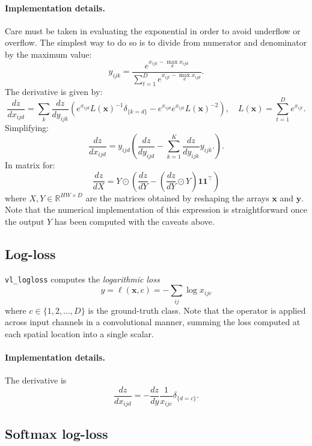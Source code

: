 \documentclass[12pt]{article}
\newcommand{\real}{\mathbb{R}}
\newcommand{\bx}{\mathbf{x}}
\newcommand{\by}{\mathbf{y}}
\newcommand{\bone}{\mathbf{1}}
\begin{document}
\paragraph{Implementation details.} Care must be taken in evaluating the exponential in order to avoid underflow or overflow. The simplest way to do so is to divide from numerator and denominator by the maximum value:
\[
 y_{ijk} = \frac{e^{x_{ijk} - \max_d x_{ijd}}}{\sum_{t=1}^D e^{x_{ijt}- \max_d x_{ijd}}}.
\]
The derivative is given by:
\[
\frac{dz}{d x_{ijd}}
=
\sum_{k}
\frac{dz}{d y_{ijk}}
\left(
e^{x_{ijd}} L(\bx)^{-1} \delta_{\{k=d\}}
-
e^{x_{ijd}}
e^{x_{ijk}} L(\bx)^{-2}
\right),
\quad
L(\bx) = \sum_{t=1}^D e^{x_{ijt}}.
\]
Simplifying:
\[
\frac{dz}{d x_{ijd}}
=
y_{ijd} 
\left(
\frac{dz}{d y_{ijd}}
-
\sum_{k=1}^K
\frac{dz}{d y_{ijk}} y_{ijk}.
\right).
\]
In matrix for:
\[
  \frac{dz}{dX} = Y \odot \left(\frac{dz}{dY} 
  - \left(\frac{dz}{dY} \odot Y\right) \bone\bone^\top\right)
\]
where $X,Y\in\real^{HW\times D}$ are the matrices obtained by reshaping the arrays
$\bx$ and $\by$. Note that the numerical implementation of this expression is straightforward once the output $Y$ has been computed with the caveats above.

\subsection{Log-loss}\label{s:loss}

\verb!vl_logloss! computes the \emph{logarithmic loss}
\[
 y = \ell(\bx,c) = - \sum_{ij} \log x_{ijc}
\]
where $c \in \{1,2,\dots,D\}$ is the ground-truth class. Note that the operator is applied across input channels in a convolutional manner, summing the loss computed at each spatial location into a single scalar. 

\paragraph{Implementation details.} The derivative is
\[
\frac{dz}{dx_{ijd}} = - \frac{dz}{dy} \frac{1}{x_{ijc}} \delta_{\{d = c\}}.
\]

\subsection{Softmax log-loss}\label{s:sfloss}
\end{document}
